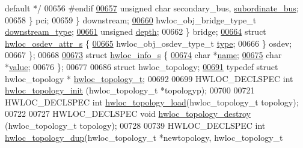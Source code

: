 \begin{DoxyCode}
{       default */}
00656 \textcolor{preprocessor}{#endif}
\hyperlink{a00266_af3f3f7d76bf03e8d2afa721c2b8d6771}{00657}         \textcolor{keywordtype}{unsigned} \textcolor{keywordtype}{char} secondary\_bus, \hyperlink{a00266_af3f3f7d76bf03e8d2afa721c2b8d6771}{subordinate\_bus};
00658       \} pci;
00659     \} downstream;
\hyperlink{a00266_ac6a169b672d0e9f75756fd5665828b93}{00660}     hwloc\_obj\_bridge\_type\_t \hyperlink{a00266_ac6a169b672d0e9f75756fd5665828b93}{downstream\_type};
\hyperlink{a00266_a336c8b22893d5d734d8c9dfca4066b46}{00661}     \textcolor{keywordtype}{unsigned} \hyperlink{a00266_a336c8b22893d5d734d8c9dfca4066b46}{depth};
00662   \} bridge;
\hyperlink{a00282}{00664}   \textcolor{keyword}{struct }\hyperlink{a00282}{hwloc\_osdev\_attr\_s} \{
\hyperlink{a00282_a31e019e27e54ac6138d04be639bb96f9}{00665}     hwloc\_obj\_osdev\_type\_t \hyperlink{a00282_a31e019e27e54ac6138d04be639bb96f9}{type};
00666   \} osdev;
00667 \};
00668 
\hyperlink{a00286}{00673} \textcolor{keyword}{struct }\hyperlink{a00286}{hwloc\_info\_s} \{
\hyperlink{a00286_a12ce1309e4381ae38b5c15d242a47124}{00674}   \textcolor{keywordtype}{char} *\hyperlink{a00286_a12ce1309e4381ae38b5c15d242a47124}{name};       
\hyperlink{a00286_a788a0073bafe660645e7b69f31a43bbb}{00675}   \textcolor{keywordtype}{char} *\hyperlink{a00286_a788a0073bafe660645e7b69f31a43bbb}{value};     
00676 \};
00677 
00686 \textcolor{keyword}{struct }hwloc\_topology;
\hyperlink{a00186_ga9d1e76ee15a7dee158b786c30b6a6e38}{00691} \textcolor{keyword}{typedef} \textcolor{keyword}{struct }hwloc\_topology * \hyperlink{a00186_ga9d1e76ee15a7dee158b786c30b6a6e38}{hwloc\_topology\_t};
00692 
00699 HWLOC\_DECLSPEC \textcolor{keywordtype}{int} \hyperlink{a00186_ga03fd4a16d8b9ee1ffc32b25fd2f6bdfa}{hwloc\_topology\_init} (hwloc\_topology\_t *topologyp);
00700 
00721 HWLOC\_DECLSPEC \textcolor{keywordtype}{int} \hyperlink{a00186_gabdf58d87ad77f6615fccdfe0535ff826}{hwloc\_topology\_load}(hwloc\_topology\_t topology);
00722 
00727 HWLOC\_DECLSPEC \textcolor{keywordtype}{void} \hyperlink{a00186_ga9f34a640b6fd28d23699d4d084667b15}{hwloc\_topology\_destroy} (hwloc\_topology\_t topology);
00728 
00739 HWLOC\_DECLSPEC \textcolor{keywordtype}{int} \hyperlink{a00186_ga62a161fc5e6f120344dc69a7bee4e587}{hwloc\_topology\_dup}(hwloc\_topology\_t *newtopology, hwloc\_topology\_t 

\end{DoxyCode}

